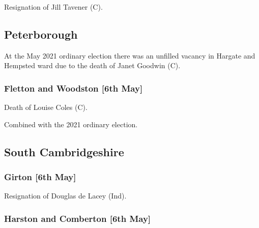 \documentclass[a4paper,openany]{book}
\begin{document}
\begin{resultsiii}

Resignation of Jill Tavener (C).

\subsection*{Peterborough}

At the May 2021 ordinary election there was an unfilled vacancy in Hargate and Hempsted ward due to the death of Janet Goodwin (C).

\subsubsection*{Fletton and Woodston \hspace*{\fill}\nolinebreak[1]%
	\enspace\hspace*{\fill}
	[6th May]}


Death of Louise Coles (C).

Combined with the 2021 ordinary election.

\subsection*{South Cambridgeshire}

\subsubsection*{Girton \hspace*{\fill}\nolinebreak[1]%
	\enspace\hspace*{\fill}
	[6th May]}


Resignation of Douglas de Lacey (Ind).

\subsubsection*{Harston and Comberton \hspace*{\fill}\nolinebreak[1]%
	\enspace\hspace*{\fill}
	[6th May]}



\end{resultsiii}
\end{document}
